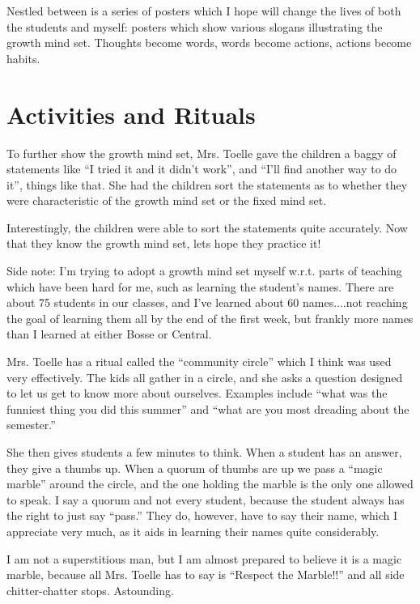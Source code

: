 \documentclass[11pt]{elegantbook}
\begin{document}
Nestled between is a series of posters which I hope will change the
lives of both the students and myself: posters which show various
slogans illustrating the growth mind set.  Thoughts become words, words
become actions, actions become habits.

\section*{Activities and Rituals}

To further show the growth mind set, Mrs. Toelle gave the children a
baggy of statements like ``I tried it and it didn't work'', and ``I'll
find another way to do it'', things like that.   She had the children
sort the statements as to whether they were characteristic of the growth
mind set or the fixed mind set.

Interestingly, the children were able to sort the statements quite
accurately.  Now that they know the growth mind set, lets hope they
practice it!

Side note: I'm trying to adopt a growth mind set myself w.r.t. parts of
teaching which have been hard for me, such as learning the student's
names.  There are about 75 students in our classes, and I've learned
about 60 names....not reaching the goal of learning them all by the
end of the first week, but frankly more names than I learned at either
Bosse or Central.

Mrs. Toelle has a ritual called the ``community circle'' which I think
was used very effectively.  The kids all gather in a circle, and she
asks a question designed to let us get to know more about ourselves.
Examples include ``what was the funniest thing you did this summer''
and ``what are you most dreading about the semester.''

She then gives students a few minutes to think.  When a student has an
answer, they give a thumbs up.  When a quorum of thumbs are up we pass
a ``magic marble'' around the circle, and the one holding the marble
is the only one allowed to speak.  I say a quorum and not every
student, because the student always has the right to just say
``pass.''  They do, however, have to say their name, which I appreciate
very much, as it aids in learning their names quite considerably.

I am not a superstitious man, but I am almost prepared to believe it
is a magic marble, because all Mrs. Toelle has to say is ``Respect the
Marble!!'' and all side chitter-chatter stops.   Astounding.
\end{document}
